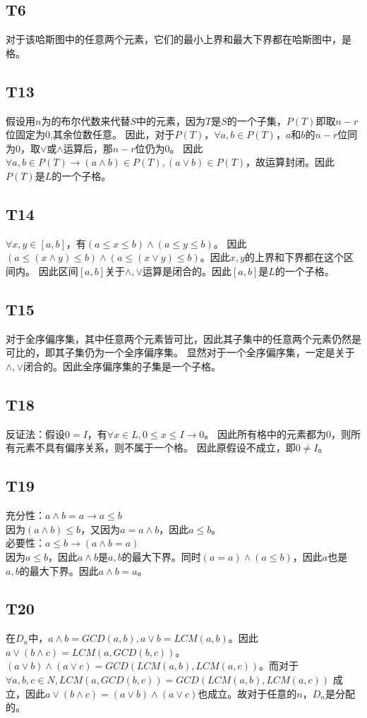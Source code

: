 \documentclass{article}
\begin{document}
\subsection{T6}
对于该哈斯图中的任意两个元素，它们的最小上界和最大下界都在哈斯图中，是格。
\subsection{T13}
假设用$n$为的布尔代数来代替$S$中的元素，因为$T$是$S$的一个子集，$P(T)$即取$n - r$位固定为0,其余位数任意。
因此，对于$P(T)$，$\forall a, b \in P(T)$，$a$和$b$的$n - r$位同为0，取$\lor$或$\land$运算后，那$n - r$位仍为0。
因此$\forall a, b \in P(T) \rightarrow (a \land b) \in P(T), (a \lor b) \in P(T)$，故运算封闭。因此$P(T)$是$L$的一个子格。
\subsection{T14}
$\forall x, y \in [a, b]$，有$(a \leq x \leq b) \land (a \leq y \leq b)$。
因此$(a \leq (x \land y) \leq b) \land (a \leq (x \lor y) \leq b)$。因此$x, y$的上界和下界都在这个区间内。
因此区间$[a, b]$关于$\land,\lor$运算是闭合的。因此$[a, b]$是$L$的一个子格。
\subsection{T15}
对于全序偏序集，其中任意两个元素皆可比，因此其子集中的任意两个元素仍然是可比的，即其子集仍为一个全序偏序集。
显然对于一个全序偏序集，一定是关于$\land,\lor$闭合的。因此全序偏序集的子集是一个子格。
\subsection{T18}
反证法：假设$0 = I$，有$\forall x \in L, 0 \leq x \leq I \rightarrow 0$。
因此所有格中的元素都为$0$，则所有元素不具有偏序关系，则不属于一个格。
因此原假设不成立，即$0 \neq I$。
\subsection{T19}
充分性：$a \land b = a \rightarrow a \leq b$\\
因为$(a \land b) \leq b$，又因为$a = a \land b$，因此$a \leq b$。\\
必要性：$a \leq b \rightarrow (a \land b = a)$\\
因为$a \leq b$，因此$a \land b$是$a, b$的最大下界。同时$(a = a) \land (a \leq b)$，因此$a$也是
$a, b$的最大下界。因此$a \land b = a$。
\subsection{T20}
在$D_n$中，$a \land b = GCD(a, b), a \lor b = LCM(a, b)$。因此$a \lor (b \land c) = LCM(a, GCD(b, c))$。
$(a \lor b) \land (a \lor c) = GCD(LCM(a, b), LCM(a, c))$。而对于$\forall a, b, c \in N, LCM(a, GCD(b, c)) = GCD(LCM(a,b), LCM(a, c))$
成立，因此$a \lor (b \land c) = (a \lor b) \land (a \lor c)$也成立。故对于任意的$n$，$D_n$是分配的。
\end{document}
